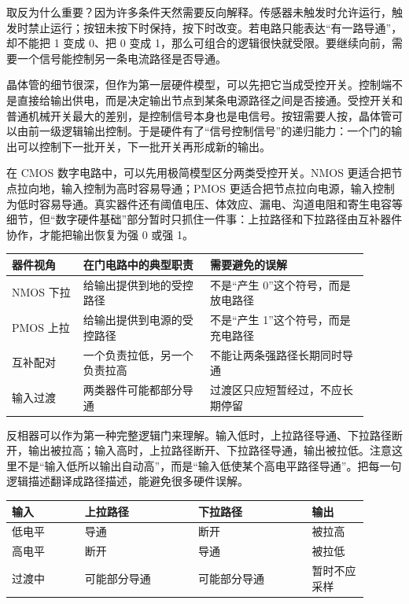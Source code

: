 取反为什么重要？因为许多条件天然需要反向解释。传感器未触发时允许运行，触发时禁止运行；按钮未按下时保持，按下时改变。若电路只能表达“有一路导通”，却不能把 1 变成 0、把 0 变成 1，那么可组合的逻辑很快就受限。要继续向前，需要一个信号能控制另一条电流路径是否导通。

晶体管的细节很深，但作为第一层硬件模型，可以先把它当成受控开关。控制端不是直接给输出供电，而是决定输出节点到某条电源路径之间是否接通。受控开关和普通机械开关最大的差别，是控制信号本身也是电信号。按钮需要人按，晶体管可以由前一级逻辑输出控制。于是硬件有了“信号控制信号”的递归能力：一个门的输出可以控制下一批开关，下一批开关再形成新的输出。

在 CMOS 数字电路中，可以先用极简模型区分两类受控开关。NMOS 更适合把节点拉向地，输入控制为高时容易导通；PMOS 更适合把节点拉向电源，输入控制为低时容易导通。真实器件还有阈值电压、体效应、漏电、沟道电阻和寄生电容等细节，但“数字硬件基础”部分暂时只抓住一件事：上拉路径和下拉路径由互补器件协作，才能把输出恢复为强 0 或强 1。

\begin{longtable}{L{0.18\linewidth}L{0.32\linewidth}L{0.4\linewidth}}
\toprule
器件视角 & 在门电路中的典型职责 & 需要避免的误解 \\
\midrule
NMOS 下拉 & 给输出提供到地的受控路径 & 不是“产生 0”这个符号，而是放电路径 \\\tablerowrule
PMOS 上拉 & 给输出提供到电源的受控路径 & 不是“产生 1”这个符号，而是充电路径 \\\tablerowrule
互补配对 & 一个负责拉低，另一个负责拉高 & 不能让两条强路径长期同时导通 \\\tablerowrule
输入过渡 & 两类器件可能都部分导通 & 过渡区只应短暂经过，不应长期停留 \\
\bottomrule
\end{longtable}

反相器可以作为第一种完整逻辑门来理解。输入低时，上拉路径导通、下拉路径断开，输出被拉高；输入高时，上拉路径断开、下拉路径导通，输出被拉低。注意这里不是“输入低所以输出自动高”，而是“输入低使某个高电平路径导通”。把每一句逻辑描述翻译成路径描述，能避免很多硬件误解。

\begin{longtable}{L{0.18\linewidth}L{0.29\linewidth}L{0.29\linewidth}L{0.14\linewidth}}
\toprule
输入 & 上拉路径 & 下拉路径 & 输出 \\
\midrule
低电平 & 导通 & 断开 & 被拉高 \\\tablerowrule
高电平 & 断开 & 导通 & 被拉低 \\\tablerowrule
过渡中 & 可能部分导通 & 可能部分导通 & 暂时不应采样 \\
\bottomrule
\end{longtable}

